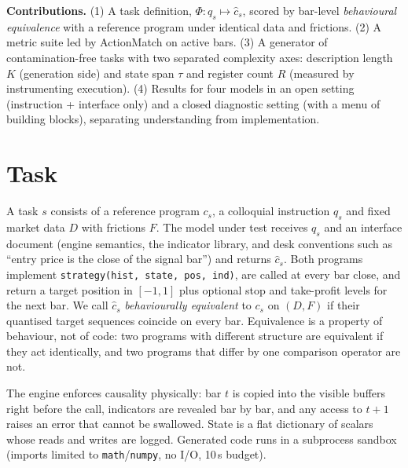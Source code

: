 \documentclass[sigconf,nonacm]{acmart}
\begin{document}
\textbf{Contributions.} (1) A task definition, $\Phi: q_s \mapsto \hat c_s$, scored by bar-level
\emph{behavioural equivalence} with a reference program under identical data and frictions.
(2) A metric suite led by ActionMatch on active bars. (3) A generator of contamination-free tasks
with two separated complexity axes: description length $K$ (generation side) and state span
$\tau$ and register count $R$ (measured by instrumenting execution). (4) Results for four models in an open setting (instruction + interface only) and a closed
diagnostic setting (with a menu of building blocks), separating understanding from implementation.

\section{Task}
A task $s$ consists of a reference program $c_s$, a colloquial instruction $q_s$ and fixed
market data $D$ with frictions $F$. The model under test receives $q_s$ and an interface
document (engine semantics, the indicator library, and desk conventions such as ``entry
price is the close of the signal bar'') and returns $\hat c_s$. Both programs implement
\texttt{strategy(hist, state, pos, ind)}, are called at every bar close, and return a target
position in $[-1,1]$ plus optional stop and take-profit levels for the next bar. We call
$\hat c_s$ \emph{behaviourally equivalent} to $c_s$ on $(D,F)$ if their quantised target
sequences coincide on every bar. Equivalence is a property of behaviour, not of code: two
programs with different structure are equivalent if they act identically, and two programs
that differ by one comparison operator are not.

The engine enforces causality physically: bar $t$ is copied into the visible buffers right
before the call, indicators are revealed bar by bar, and any access to $t{+}1$ raises an error
that cannot be swallowed. State is a flat dictionary of scalars whose reads and writes are logged.
Generated code runs in a subprocess sandbox (imports limited to \texttt{math}/\texttt{numpy}, no
I/O, 10\,s budget).
\end{document}
